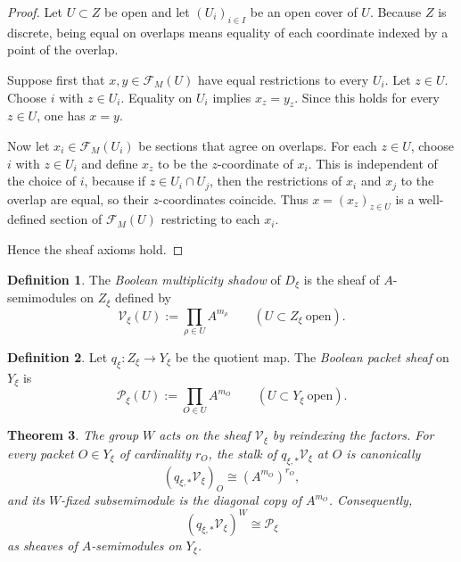 \documentclass[11pt,a4paper]{article}
\numberwithin{equation}{section}
\newtheorem{theorem}{Theorem}[section]
\theoremstyle{definition}
\newtheorem{definition}[theorem]{Definition}
\theoremstyle{remark}
\newcommand{\cP}{\mathcal P}
\newcommand{\cV}{\mathcal V}
\newcommand{\cF}{\mathcal F}
\begin{document}
\begin{proof}
Let $U\subset Z$ be open and let $(U_i)_{i\in I}$ be an open cover of $U$.  Because $Z$ is discrete, being equal on overlaps means equality of each coordinate indexed by a point of the overlap.

Suppose first that $x,y\in \cF_M(U)$ have equal restrictions to every $U_i$.  Let $z\in U$.  Choose $i$ with $z\in U_i$.  Equality on $U_i$ implies $x_z=y_z$.  Since this holds for every $z\in U$, one has $x=y$.

Now let $x_i\in \cF_M(U_i)$ be sections that agree on overlaps.  For each $z\in U$, choose $i$ with $z\in U_i$ and define $x_z$ to be the $z$-coordinate of $x_i$.  This is independent of the choice of $i$, because if $z\in U_i\cap U_j$, then the restrictions of $x_i$ and $x_j$ to the overlap are equal, so their $z$-coordinates coincide.  Thus $x=(x_z)_{z\in U}$ is a well-defined section of $\cF_M(U)$ restricting to each $x_i$.

Hence the sheaf axioms hold.
\end{proof}

\begin{definition}
The \emph{Boolean multiplicity shadow} of $D_\xi$ is the sheaf of $A$-semimodules on $Z_\xi$ defined by
\[
\cV_\xi(U):=\prod_{\rho\in U} A^{m_\rho}
\qquad (U\subset Z_\xi\ \text{open}).
\]
\end{definition}

\begin{definition}
Let $q_\xi:Z_\xi\to Y_\xi$ be the quotient map.  The \emph{Boolean packet sheaf} on $Y_\xi$ is
\[
\cP_\xi(U):=\prod_{O\in U} A^{m_O}
\qquad (U\subset Y_\xi\ \text{open}).
\]
\end{definition}

\begin{theorem}\label{P3:thm:packet-descent-xi}
The group $W$ acts on the sheaf $\cV_\xi$ by reindexing the factors.  For every packet $O\in Y_\xi$ of cardinality $r_O$, the stalk of $q_{\xi,*}\cV_\xi$ at $O$ is canonically
\[
(q_{\xi,*}\cV_\xi)_O\cong (A^{m_O})^{r_O},
\]
and its $W$-fixed subsemimodule is the diagonal copy of $A^{m_O}$.  Consequently,
\[
(q_{\xi,*}\cV_\xi)^W\cong \cP_\xi
\]
as sheaves of $A$-semimodules on $Y_\xi$.
\end{theorem}
\end{document}
